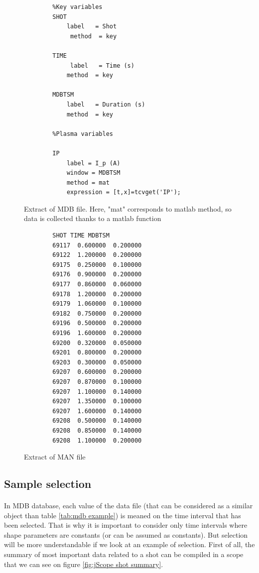 \documentclass[12pt]{article}
\begin{document}
\begin{figure}[h]
    \begin{minipage}{0.5\textwidth}
        \centering
        \begin{lstlisting}
        %Key variables
        SHOT
            label   = Shot
             method  = key

        TIME
             label   = Time (s)
            method  = key

        MDBTSM
            label   = Duration (s)
            method  = key

        %Plasma variables

        IP
            label = I_p (A)
            window = MDBTSM
            method = mat
            expression = [t,x]=tcvget('IP');
        \end{lstlisting}
        \caption{Extract of MDB file. Here, "mat" corresponds to matlab method, so data is collected thanks to a matlab function}
        \label{fig:mdb file}
    \end{minipage}
    \begin{minipage}{0.5\textwidth}
        \centering
        \begin{lstlisting}
        SHOT TIME MDBTSM
        69117  0.600000  0.200000
        69122  1.200000  0.200000
        69175  0.250000  0.100000
        69176  0.900000  0.200000
        69177  0.860000  0.060000
        69178  1.200000  0.200000
        69179  1.060000  0.100000
        69182  0.750000  0.200000
        69196  0.500000  0.200000
        69196  1.600000  0.200000
        69200  0.320000  0.050000
        69201  0.800000  0.200000
        69203  0.300000  0.050000
        69207  0.600000  0.200000
        69207  0.870000  0.100000
        69207  1.100000  0.140000
        69207  1.350000  0.100000
        69207  1.600000  0.140000
        69208  0.500000  0.140000
        69208  0.850000  0.140000
        69208  1.100000  0.200000
        \end{lstlisting}
        \caption{Extract of MAN file}
        \label{fig:man file}
    \end{minipage}
\end{figure}

\subsection{Sample selection}

\paragraph{}
In MDB database, each value of the data file (that can be considered as a similar object than table \ref{tab:mdb example}) is meaned on the time interval that has been selected. That is why it is important to consider only time intervals where shape parameters are constants (or can be assumed as constants). But selection will be more understandable if we look at an example of selection. First of all, the summary of most important data related to a shot can be compiled in a scope that we can see on figure \ref{fig:jScope shot summary}.
\end{document}
